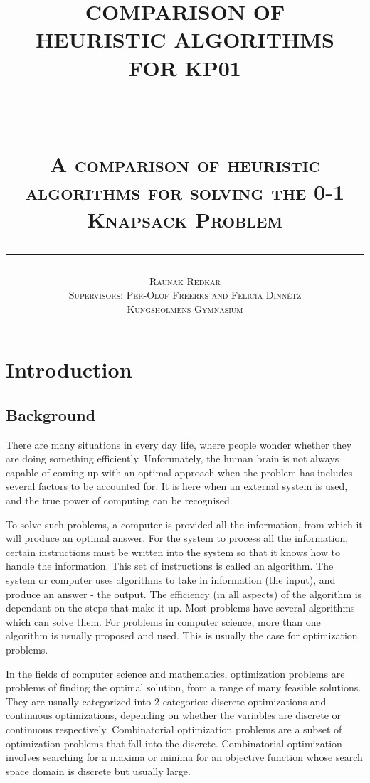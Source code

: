 \documentclass[titlepage]{article}
\title{
    \textbf{COMPARISON OF \\
    HEURISTIC ALGORITHMS \\
    FOR KP01} \\[0.5cm]
    \rule{12cm}{0.3mm} \\[0.5cm] 
    \small \scshape{A comparison of heuristic algorithms for solving the 0-1 Knapsack Problem} \\[0.4cm]
    \rule{12cm}{0.3mm}
    \vskip -0.3cm
}
\author{
    \small \scshape{Raunak Redkar} \\ 
    \small \scshape{Supervisors: Per-Olof Freerks and Felicia Dinnétz} \\
    \scriptsize \scshape{Kungsholmens Gymnasium}
}
\begin{document}
\renewcommand{\arraystretch}{1.5}

\onehalfspacing

\maketitle

\newpage
\tableofcontents
\listofalgorithms
\newpage
{}

\section{Introduction}

\subsection{Background}

\renewcommand{\familydefault}{Computer Modern}
There are many situations in every day life, where people wonder whether they are doing something efficiently. Unforunately, the human brain is not always capable of coming up with an optimal approach when the problem has includes several factors to be accounted for. It is here when an external system is used, and the true power of computing can be recognised. 

To solve such problems, a computer is provided all the information, from which it will produce an optimal answer. For the system to process all the information, certain instructions must be written into the system so that it knows how to handle the information. This set of instructions is called an algorithm. The system or computer uses algorithms to take in information (the input), and produce an answer - the output. The efficiency (in all aspects) of the algorithm is dependant on the steps that make it up. Most problems have several algorithms which can solve them. For problems in computer science, more than one algorithm is usually proposed and used. This is usually the case for optimization problems. 

In the fields of computer science and mathematics, optimization problems are problems of finding the optimal solution, from a range of many feasible solutions. They are usually categorized into 2 categories: discrete optimizations and continuous optimizations, depending on whether the variables are discrete or continuous respectively. Combinatorial optimization problems are a subset of optimization problems that fall into the discrete. Combinatorial optimization involves searching for a maxima or minima for an objective function whose search space domain is discrete but usually large.
\end{document}

